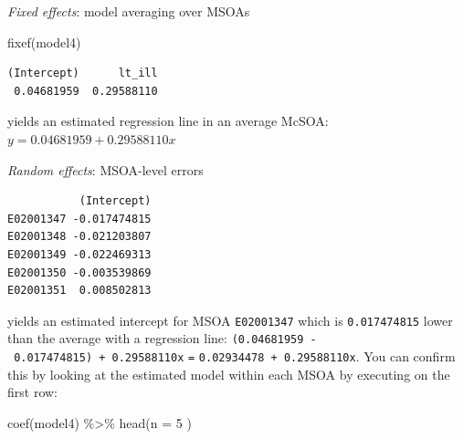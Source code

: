 \documentclass[
  letterpaper,
  DIV=11,
  numbers=noendperiod,
  oneside]{scrreprt}
\newenvironment{Shaded}{\begin{snugshade}}{\end{snugshade}}
\newcommand{\AttributeTok}[1]{\textcolor[rgb]{0.40,0.45,0.13}{#1}}
\newcommand{\DecValTok}[1]{\textcolor[rgb]{0.68,0.00,0.00}{#1}}
\newcommand{\FunctionTok}[1]{\textcolor[rgb]{0.28,0.35,0.67}{#1}}
\newcommand{\NormalTok}[1]{\textcolor[rgb]{0.00,0.23,0.31}{#1}}
\newcommand{\OtherTok}[1]{\textcolor[rgb]{0.00,0.23,0.31}{#1}}
\newcommand{\SpecialCharTok}[1]{\textcolor[rgb]{0.37,0.37,0.37}{#1}}
\begin{document}
\emph{Fixed effects}: model averaging over MSOAs

\begin{Shaded}
\begin{Highlighting}[]
\FunctionTok{fixef}\NormalTok{(model4)}
\end{Highlighting}
\end{Shaded}

\begin{verbatim}
(Intercept)      lt_ill 
 0.04681959  0.29588110 
\end{verbatim}

yields an estimated regression line in an average McSOA:
\(y = 0.04681959 + 0.29588110x\)

\emph{Random effects}: MSOA-level errors

\begin{Shaded}
\end{Shaded}

\begin{verbatim}
           (Intercept)
E02001347 -0.017474815
E02001348 -0.021203807
E02001349 -0.022469313
E02001350 -0.003539869
E02001351  0.008502813
\end{verbatim}

yields an estimated intercept for MSOA \texttt{E02001347} which is
\texttt{0.017474815} lower than the average with a regression line:
\texttt{(0.04681959\ -\ 0.017474815)\ +\ 0.29588110x} \texttt{=}
\texttt{0.02934478\ +\ 0.29588110x}. You can confirm this by looking at
the estimated model within each MSOA by executing on the first row:

\begin{Shaded}
\begin{Highlighting}[]
\FunctionTok{coef}\NormalTok{(model4) }\SpecialCharTok{\%\textgreater{}\%} \FunctionTok{head}\NormalTok{(}\AttributeTok{n =} \DecValTok{5}\NormalTok{ )}
\end{Highlighting}
\end{Shaded}
\end{document}
